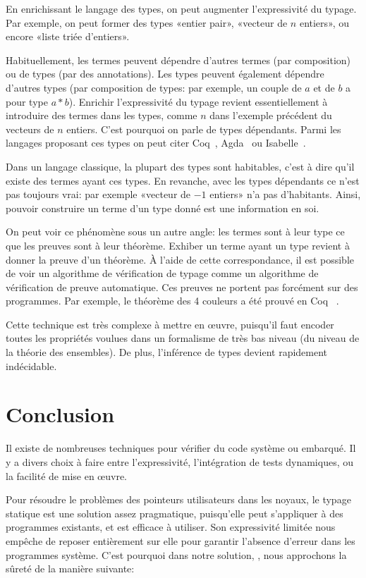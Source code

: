 En enrichissant le langage des types, on peut augmenter l'expressivité du
typage. Par exemple, on peut former des types «entier pair», «vecteur de $n$
entiers», ou encore «liste triée d'entiers».

Habituellement, les termes peuvent dépendre d'autres termes (par composition) ou
de types (par des annotations). Les types peuvent également dépendre d'autres
types (par composition de types: par exemple, un couple de $a$ et de $b$ a pour
type $a * b$). Enrichir l'expressivité du typage revient essentiellement à
introduire des termes dans les types, comme $n$ dans l'exemple précédent du
vecteurs de $n$ entiers. C'est pourquoi on parle de types dépendants. Parmi les
langages proposant ces types on peut citer Coq~\cite{coqmanual},
Agda~\cite{agdatutorial} ou Isabelle~\cite{isabelletutorial}.

Dans un langage classique, la plupart des types sont habitables, c'est à dire
qu'il existe des termes ayant ces types. En revanche, avec les types dépendants
ce n'est pas toujours vrai: par exemple «vecteur de $-1$ entiers» n'a pas
d'habitants. Ainsi, pouvoir construire un terme d'un type donné est une
information en soi.

On peut voir ce phénomène sous un autre angle: les termes sont à leur type ce
que les preuves sont à leur théorème. Exhiber un terme ayant un type revient à
donner la preuve d'un théorème. À l'aide de cette correspondance, il est
possible de voir un algorithme de vérification de typage comme un algorithme de
vérification de preuve automatique. Ces preuves ne portent pas forcément sur des
programmes. Par exemple, le théorème des 4 couleurs a été prouvé en
Coq~\cite{4colproof} .

Cette technique est très complexe à mettre en œuvre, puisqu'il faut encoder
toutes les propriétés voulues dans un formalisme de très bas niveau (du niveau
de la théorie des ensembles). De plus, l'inférence de types devient rapidement
indécidable.

\section*{Conclusion}

Il existe de nombreuses techniques pour vérifier du code système ou embarqué. Il
y a divers choix à faire entre l'expressivité, l'intégration de tests
dynamiques, ou la facilité de mise en œuvre.

Pour résoudre le problèmes des pointeurs utilisateurs dans les noyaux, le typage
statique est une solution assez pragmatique, puisqu'elle peut s'appliquer à des
programmes existants, et est efficace à utiliser. Son expressivité limitée nous
empêche de reposer entièrement sur elle pour garantir l'absence d'erreur dans
les programmes système. C'est pourquoi dans notre solution, \langname, nous
approchons la sûreté de la manière suivante:

